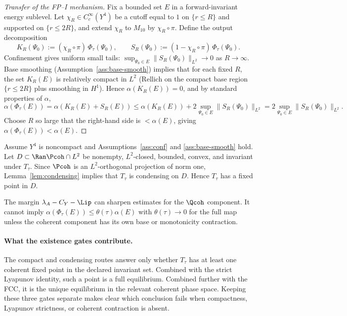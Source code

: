 \documentclass[11pt]{article}
\newcommand{\Mten}{\ensuremath{M_{10}}}
\newcommand{\Yfour}{\ensuremath{Y^{4}}}
\newcommand{\Aop}{A}
\newcommand{\Ltwo}{\ensuremath{L^{2}}}
\begin{document}
\begin{proof}[Transfer of the FP--I mechanism]
Fix a bounded set $E$ in a forward-invariant energy sublevel. Let $\chi_R\in C_c^\infty(\Yfour)$ be a cutoff
equal to $1$ on $\{r\le R\}$ and supported on $\{r\le 2R\}$, and extend $\chi_R$ to $\Mten$ by $\chi_R\circ\pi$.
Define the output decomposition
\[
K_R(\Psi_0):=(\chi_R\circ\pi)\,\Phi_\tau(\Psi_0),
\qquad
S_R(\Psi_0):=(1-\chi_R\circ\pi)\,\Phi_\tau(\Psi_0).
\]
Confinement gives uniform small tails: $\sup_{\Psi_0\in E}\|S_R(\Psi_0)\|_{\Ltwo}\to 0$ as $R\to\infty$.
Base smoothing (Assumption~\ref{ass:base-smooth}) implies that for each fixed $R$, the set $K_R(E)$
is relatively compact in $\Ltwo$ (Rellich on the compact base region $\{r\le 2R\}$ plus smoothing in $H^1$).
Hence $\alpha(K_R(E))=0$, and by standard properties of $\alpha$,
\[
\alpha(\Phi_\tau(E))=\alpha(K_R(E)+S_R(E))\le \alpha(K_R(E)) + 2\sup_{\Psi_0\in E}\|S_R(\Psi_0)\|_{\Ltwo}
=2\sup_{\Psi_0\in E}\|S_R(\Psi_0)\|_{\Ltwo}.
\]
Choose $R$ so large that the right-hand side is $<\alpha(E)$, giving $\alpha(\Phi_\tau(E))<\alpha(E)$.
\end{proof}

\begin{corollary}\label{thm:darbo}
Assume $\Yfour$ is noncompact and Assumptions~\ref{ass:conf} and \ref{ass:base-smooth} hold.
Let $D\subset \Ran\Pcoh\cap\Ltwo$ be nonempty, $L^2$-closed, bounded,
convex, and invariant under $T_\tau$. Since $\Pcoh$ is an $L^2$-orthogonal
projection of norm one, Lemma~\ref{lem:condensing} implies that $T_\tau$ is
condensing on $D$. Hence $T_\tau$ has a fixed point in $D$.
\end{corollary}

\begin{remark}
The margin $\lambda_{\Aop}-C_Y-\Lip$ can sharpen estimates for the
$\Qcoh$ component. It cannot imply
$\alpha(\Phi_\tau(E))\le\theta(\tau)\alpha(E)$ with
$\theta(\tau)\to0$ for the full map unless the coherent component has its own
base or monotonicity contraction.
\end{remark}

\paragraph{What the existence gates contribute.}
The compact and condensing routes answer only whether $T_\tau$ has at least
one coherent fixed point in the declared invariant set.  Combined with the
strict Lyapunov identity, such a point is a full equilibrium.  Combined
further with the FCC, it is the unique equilibrium in the relevant coherent
phase space.  Keeping these three gates separate makes clear which conclusion
fails when compactness, Lyapunov strictness, or coherent contraction is absent.
\end{document}
